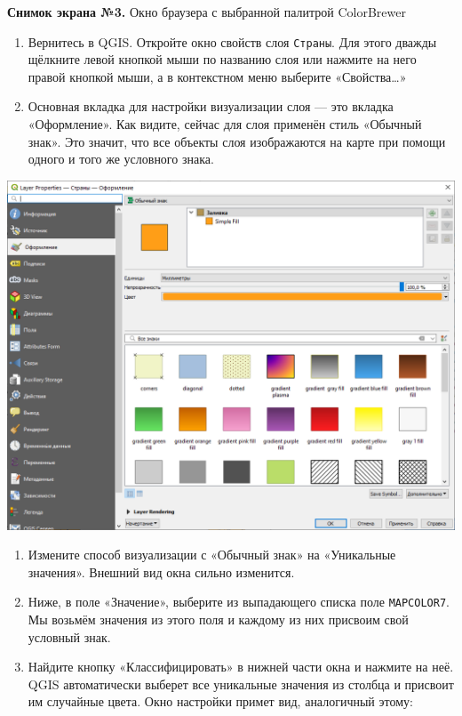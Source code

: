 \documentclass[
  12pt,
]{book}
\begin{document}
\textbf{Снимок экрана №3.} Окно браузера с выбранной палитрой ColorBrewer

\begin{enumerate}
\def\labelenumi{\arabic{enumi}.}
\setcounter{enumi}{4}
\item
  Вернитесь в QGIS. Откройте окно свойств слоя \texttt{Страны}. Для этого дважды щёлкните левой кнопкой мыши по названию слоя или нажмите на него правой кнопкой мыши, а в контекстном меню выберите «Свойства\ldots»
\item
  Основная вкладка для настройки визуализации слоя --- это вкладка «Оформление». Как видите, сейчас для слоя применён стиль «Обычный знак». Это значит, что все объекты слоя изображаются на карте при помощи одного и того же условного знака.
\end{enumerate}

\includegraphics{images/Ex01_WorldMap/style.png}

\begin{enumerate}
\def\labelenumi{\arabic{enumi}.}
\setcounter{enumi}{6}
\item
  Измените способ визуализации с «Обычный знак» на «Уникальные значения». Внешний вид окна сильно изменится.
\item
  Ниже, в поле «Значение», выберите из выпадающего списка поле \texttt{MAPCOLOR7}. Мы возьмём значения из этого поля и каждому из них присвоим свой условный знак.
\item
  Найдите кнопку «Классифицировать» в нижней части окна и нажмите на неё. QGIS автоматически выберет все уникальные значения из столбца и присвоит им случайные цвета. Окно настройки примет вид, аналогичный этому:
\end{enumerate}
\end{document}
